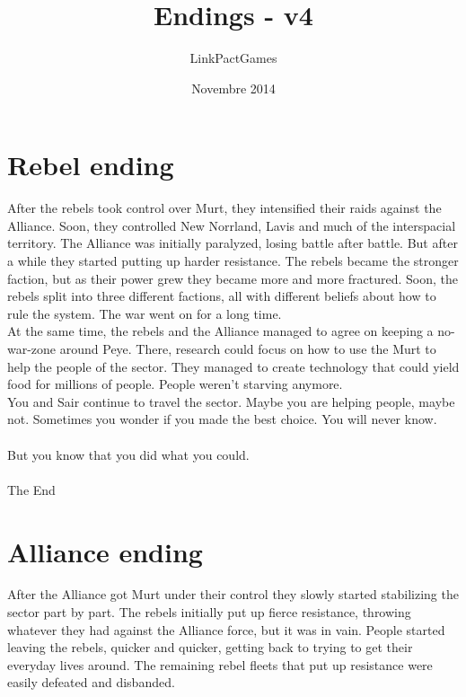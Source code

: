 \documentclass[a4paper,12pt]{article}
\begin{document}
\title{Endings - v4}
\author{LinkPactGames}
\date{Novembre 2014}
\maketitle

\section{Rebel ending}

After the rebels took control over Murt, they intensified their raids against the Alliance.
Soon, they controlled New Norrland, Lavis and much of the interspacial territory.
The Alliance was initially paralyzed, losing battle after battle. But after a while they started
putting up harder resistance.
The rebels became the stronger faction, but as their power grew they became more and more fractured.
Soon, the rebels split into three different factions, all with different beliefs about how to rule the system.
The war went on for a long time.\\

At the same time, the rebels and the Alliance managed to agree on keeping a no-war-zone around Peye.
There, research could focus on how to use the Murt to help the people of the sector. They managed to create technology that
could yield food for millions of people. People weren't starving anymore.\\

You and Sair continue to travel the sector. Maybe you are helping people, maybe not.
Sometimes you wonder if you made the best choice. You will never know.\\\\
But you know that you did what you could.\\\\
The End

\section{Alliance ending}

After the Alliance got Murt under their control they slowly started stabilizing the sector part by part.
The rebels initially put up fierce resistance, throwing whatever they had against the Alliance force, but it was in vain. 
People started leaving the rebels, quicker and quicker, getting back to trying to get their everyday lives around.
The remaining rebel fleets that put up resistance were easily defeated and disbanded.\\
\end{document}
